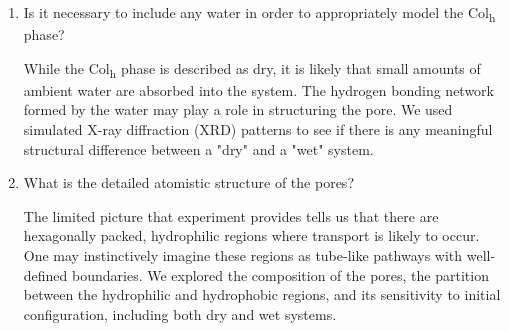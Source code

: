\documentclass[journal=jpcbfk,manuscript=article]{achemso}
\begin{document}
\begin{enumerate}
        \item Is it necessary to include any water in order to appropriately model the 
        Col\textsubscript{h} phase? \label{point:water}

	While the Col\textsubscript{h} phase is described as dry, it is likely
	that small amounts of ambient water are absorbed into the system. The hydrogen
	bonding network formed by the water may play a role in structuring the pore. We
	used simulated X-ray diffraction (XRD) patterns to see if there is any
	meaningful structural difference between a "dry" and a "wet" system.

	\item What is the detailed atomistic structure of the pores?\label{point:composition}

	The limited picture that experiment provides tells us that there are hexagonally packed, 
	hydrophilic regions where transport is likely to occur. One may instinctively imagine these 
	regions as tube-like pathways with well-defined boundaries. We explored the composition
	of the pores, the partition between the hydrophilic and hydrophobic regions, and its 
	sensitivity to initial configuration, including both dry and wet systems. 

  \end{enumerate}
  
%
\end{document}
